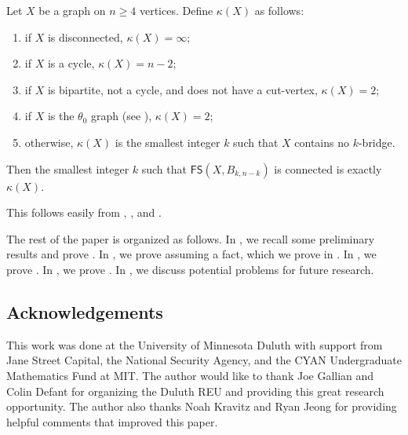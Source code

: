 \documentclass{mystyle}
\newcommand{\FS}{\mathsf{FS}}
\begin{document}
\begin{theorem}\label{thm_book}
    Let $X$ be a graph on $n \geq 4$ vertices. Define $\kappa(X)$ as follows:
    \begin{enumerate}
        \item if $X$ is disconnected, $\kappa(X) = \infty$;
        \item if $X$ is a cycle, $\kappa(X) = n - 2$;
        \item if $X$ is bipartite, not a cycle, and does not have a cut-vertex, $\kappa(X) = 2$;
        \item if $X$ is the $\theta_0$ graph (see ), $\kappa(X) = 2$;
        \item otherwise, $\kappa(X)$ is the smallest integer $k$ such that $X$ contains no $k$-bridge. 
    \end{enumerate}
    Then the smallest integer $k$ such that $\FS(X, B_{k, n - k})$ is connected is exactly $\kappa(X)$.
\end{theorem}
This follows easily from , , and .

The rest of the paper is organized as follows. In , we recall some preliminary results and prove . In , we prove  assuming a fact, which we prove in . In , we prove . In , we prove . In , we discuss potential problems for future research. 

\subsection*{Acknowledgements}
This work was done at the University of Minnesota Duluth with support from Jane Street Capital, the National Security Agency, and the CYAN Undergraduate Mathematics Fund at MIT. The author would like to thank Joe Gallian and Colin Defant for organizing the Duluth REU and providing this great research opportunity. The author also thanks Noah Kravitz and Ryan Jeong for providing helpful comments that improved this paper. 
\end{document}
